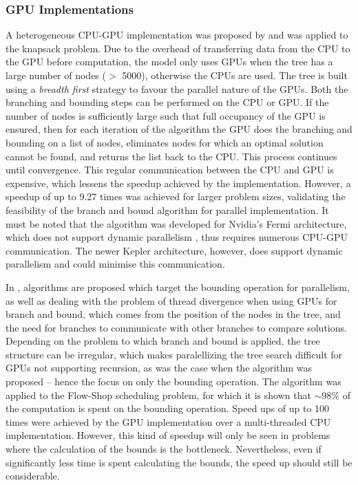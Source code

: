 \documentclass[10pt,twocolumn]{article}
\begin{document}
\subsubsection{GPU Implementations } \label{ssec:gpuimp}

A heterogeneous CPU-GPU implementation was proposed by \cite{bouk:2012} and was applied to the knapsack 
problem. Due to the overhead of transferring data from the CPU to the GPU before computation, the model only 
uses GPUs when the tree has a large number of nodes ($>$ 5000), otherwise the CPUs are used. The 
tree is built using a \textit{breadth first} strategy to favour the parallel nature of the GPUs. Both the
branching and bounding steps can be performed on the CPU or GPU. If the number of nodes is sufficiently large
such that full occupancy of the GPU is ensured, then for each iteration of the algorithm the GPU does the
branching and bounding on a list of nodes, eliminates nodes for which an optimal solution cannot be found, and
returns the list back to the CPU. This process continues until convergence. This regular communication between
the CPU and GPU is expensive, which lessens the speedup achieved by the implementation. However, a speedup of 
up to 9.27 times was achieved for larger problem sizes, validating the feasibility of the branch and bound 
algorithm for parallel implementation. It must be noted that the algorithm was developed for Nvidia's Fermi
architecture, which does not support dynamic parallelism \cite{nvidia:2012}, thus requires numerous CPU-GPU 
communication. The newer Kepler architecture, however, does support dynamic parallelism and could minimise
this communication. 

In \cite{melab:2012, chakroun:2012}, algorithms are proposed which target the bounding operation for parallelism,
as well as dealing with the problem of thread divergence when using GPUs for branch and bound, which comes
from the position of the nodes in the tree, and the need for branches to communicate with other branches to
compare solutions. Depending on the problem to which branch and bound is applied, the tree structure can be
irregular, which makes paralellizing the tree search difficult for GPUs not supporting recursion, as was the 
case when the algorithm was proposed -- hence the focus on only the bounding operation. The algorithm was 
applied to the Flow-Shop scheduling problem, for which it is shown that $\mathit{\sim}$98$\%$ of the 
computation is spent on the bounding operation. Speed ups of up to 100 times were achieved by the GPU 
implementation over a multi-threaded CPU implementation. However, this kind of speedup will only be seen in 
problems where the calculation of the bounds is the bottleneck. Nevertheless, even if significantly less 
time is spent calculating the bounds, the speed up should still be considerable.
\end{document}
